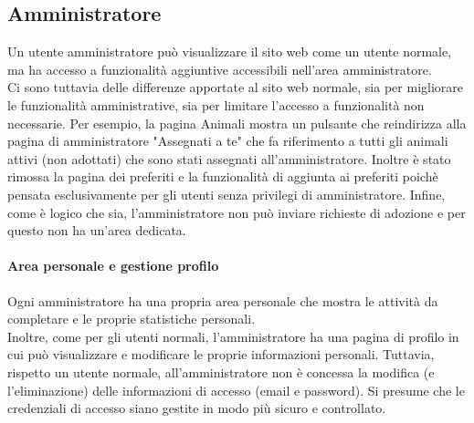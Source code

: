\subsection{Amministratore}
Un utente amministratore può visualizzare il sito web come un utente normale, ma ha accesso a funzionalità aggiuntive accessibili nell'area amministratore.\\
Ci sono tuttavia delle differenze apportate al sito web normale, sia per migliorare le funzionalità amministrative, sia per limitare l'accesso a funzionalità non necessarie.
Per esempio, la pagina Animali mostra un pulsante che reindirizza alla pagina di amministratore "Assegnati a te" che fa riferimento a tutti gli animali attivi (non adottati) che sono stati assegnati all'amministratore. Inoltre è stato rimossa la pagina dei preferiti e la funzionalità di aggiunta ai preferiti poichè pensata esclusivamente per gli utenti senza privilegi di amministratore.
Infine, come è logico che sia, l'amministratore non può inviare richieste di adozione e per questo non ha un'area dedicata.
\paragraph{Area personale e gestione profilo}
Ogni amministratore ha una propria area personale che mostra le attività da completare e le proprie statistiche personali.\\
Inoltre, come per gli utenti normali, l'amministratore ha una pagina di profilo in cui può visualizzare e modificare le proprie informazioni personali. Tuttavia, rispetto un utente normale, all'amministratore non è concessa la modifica (e l'eliminazione) delle informazioni di accesso (email e password). Si presume che le credenziali di accesso siano gestite in modo più sicuro e controllato.
